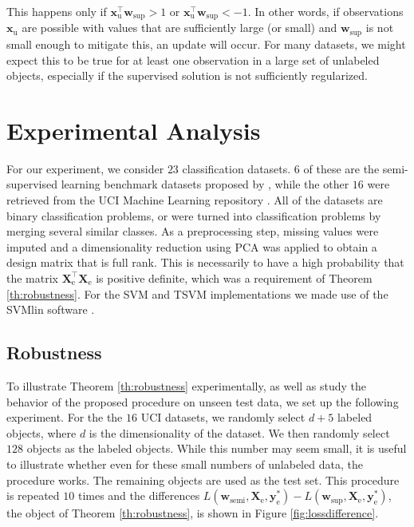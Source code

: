\documentclass{article}
\newcommand{\Xe}{\vec{X}_\mathrm{e}  }
\renewcommand{\vec}[1]{\mathbf{#1}}
\begin{document}
This happens only if $\vec{x}_\text{u}^\top \vec{w}_\text{sup} > 1$ or $\vec{x}_\text{u}^\top \vec{w}_\text{sup} < -1$. In other words, if observations $\vec{x}_\text{u}$ are possible with values that are sufficiently large (or small) and $\vec{w}_\text{sup}$ is not small enough to mitigate this, an update will occur. For many datasets, we might expect this to be true for at least one observation in a large set of unlabeled objects, especially if the supervised solution is not sufficiently regularized.


\section{Experimental Analysis}
For our experiment, we consider $23$ classification datasets. $6$ of these are the semi-supervised learning benchmark datasets proposed by \cite{Chapelle2006}, while the other $16$ were retrieved from the UCI Machine Learning repository \cite{Bache2013}. All of the datasets are binary classification problems, or were turned into classification problems by merging several similar classes. As a preprocessing step, missing values were imputed and a dimensionality reduction using PCA was applied to obtain a design matrix that is full rank. This is necessarily to have a high probability that the matrix $\vec{X}_\text{e}^\top \vec{X}_\text{e}$ is positive definite, which was a requirement of Theorem \ref{th:robustness}. For the SVM and TSVM implementations we made use of the SVMlin software \cite{Sindhwani2006}.

\subsection{Robustness}
To illustrate Theorem \ref{th:robustness} experimentally, as well as study the behavior of the proposed procedure on unseen test data, we set up the following experiment. For the the $16$ UCI datasets, we randomly select $d+5$ labeled objects, where $d$ is the dimensionality of the dataset. We then randomly select $128$ objects as the labeled objects. While this number may seem small, it is useful to illustrate whether even for these small numbers of unlabeled data, the procedure works. The remaining objects are used as the test set. This procedure is repeated $10$ times and the differences $L(\vec{w}_\text{semi},\Xe,\vec{y}_\text{e}^{\ast}) - L(\vec{w}_\text{sup},\Xe,\vec{y}_\text{e}^{\ast}) $, the object of Theorem \ref{th:robustness}, is shown in Figure \ref{fig:lossdifference}.
\end{document}
